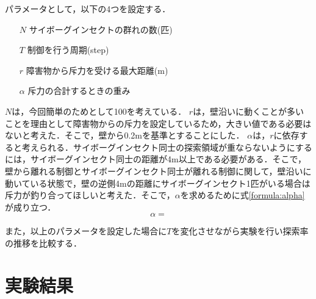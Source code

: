\documentclass[a4paper,11pt]{jarticle}
\begin{document}
	パラメータとして，以下の4つを設定する．
	
	\begin{itemize}
		\item[$N$] サイボーグインセクトの群れの数(匹)
		\item[$T$] 制御を行う周期(step)
		\item[$r$] 障害物から斥力を受ける最大距離(m)
		\item[$\alpha$] 斥力の合計するときの重み
	\end{itemize}

	$N$は，今回簡単のためとして100を考えている．
	$r$は，壁沿いに動くことが多いことを理由として障害物からの斥力を設定しているため，大きい値である必要はないと考えた．そこで，壁から0.2mを基準とすることにした．
	$\alpha$は，$r$に依存すると考えられる．サイボーグインセクト同士の探索領域が重ならないようにするには，サイボーグインセクト同士の距離が4m以上である必要がある．そこで，壁から離れる制御とサイボーグインセクト同士が離れる制御に関して，壁沿いに動いている状態で，壁の逆側4mの距離にサイボーグインセクト1匹がいる場合は斥力が釣り合ってほしいと考えた．そこで，$\alpha$を求めるために式\ref{formula:alpha}が成り立つ．
	\begin{equation}
	\label{formula:alpha}
	\alpha = 
	\end{equation}
	
	また，以上のパラメータを設定した場合に$T$を変化させながら実験を行い探索率の推移を比較する．
	\section{実験結果}
	\label{sec:result}
\end{document}
